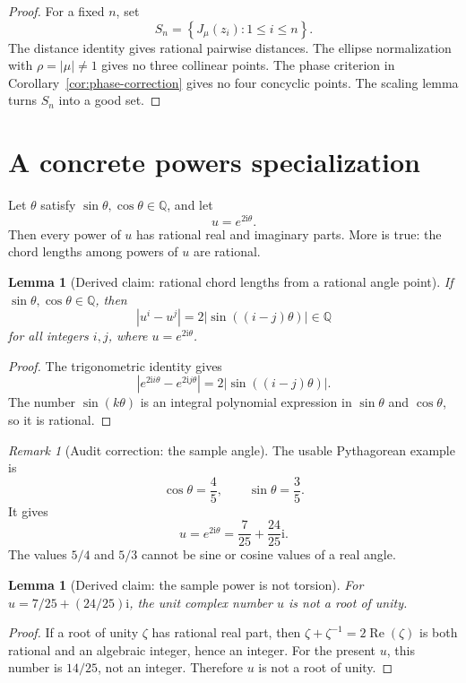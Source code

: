 \documentclass[11pt]{article}
\newtheorem{lemma}[theorem]{Lemma}
\theoremstyle{definition}
\theoremstyle{remark}
\newtheorem{remark}[theorem]{Remark}
\newcommand{\Q}{\mathbb{Q}}
\newcommand{\ii}{\mathrm{i}}
\newcommand{\abs}[1]{\left|#1\right|}
\newcommand{\set}[1]{\left\{#1\right\}}
\begin{document}
\begin{proof}
For a fixed \(n\), set
\[
S_n=\set{J_\mu(z_i):1\le i\le n}.
\]
The distance identity gives rational pairwise distances.  The ellipse
normalization with \(\rho=\abs\mu\ne 1\) gives no three collinear points.  The
phase criterion in Corollary~\ref{cor:phase-correction} gives no four concyclic
points.  The scaling lemma turns \(S_n\) into a good set.
\end{proof}

\section{A concrete powers specialization}

Let \(\theta\) satisfy \(\sin\theta,\cos\theta\in\Q\), and let
\[
u=e^{2\ii\theta}.
\]
Then every power of \(u\) has rational real and imaginary parts.  More is true:
the chord lengths among powers of \(u\) are rational.

\begin{lemma}[Derived claim: rational chord lengths from a rational angle point]
If \(\sin\theta,\cos\theta\in\Q\), then
\[
\abs{u^i-u^j}=2\abs{\sin((i-j)\theta)}\in\Q
\]
for all integers \(i,j\), where \(u=e^{2\ii\theta}\).
\end{lemma}

\begin{proof}
The trigonometric identity gives
\[
\abs{e^{2\ii i\theta}-e^{2\ii j\theta}}
=2\abs{\sin((i-j)\theta)}.
\]
The number \(\sin(k\theta)\) is an integral polynomial expression in
\(\sin\theta\) and \(\cos\theta\), so it is rational.
\end{proof}

\begin{remark}[Audit correction: the sample angle]
The usable Pythagorean example is
\[
\cos\theta=\frac45,
\qquad
\sin\theta=\frac35.
\]
It gives
\[
u=e^{2\ii\theta}=\frac7{25}+\frac{24}{25}\ii.
\]
The values \(5/4\) and \(5/3\) cannot be sine or cosine values of a real angle.
\end{remark}

\begin{lemma}[Derived claim: the sample power is not torsion]
For \(u=7/25+(24/25)\ii\), the unit complex number \(u\) is not a root of unity.
\end{lemma}

\begin{proof}
If a root of unity \(\zeta\) has rational real part, then
\(\zeta+\zeta^{-1}=2\operatorname{Re}(\zeta)\) is both rational and an algebraic
integer, hence an integer.  For the present \(u\), this number is
\(14/25\), not an integer.  Therefore \(u\) is not a root of unity.
\end{proof}
\end{document}

